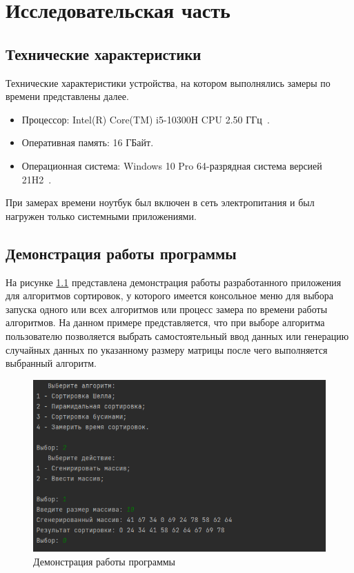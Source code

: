 \chapter{Исследовательская часть}

\section{Технические характеристики}

Технические характеристики устройства, на котором выполнялись замеры по времени представлены далее.

\begin{itemize}[label=---]
	\item Процессор: Intel(R) Core(TM) i5-10300H CPU 2.50 ГГц~\cite{intel}.
	\item Оперативная память: 16 ГБайт.
	\item Операционная система: Windows 10 Pro 64-разрядная система версией 21H2~\cite{windows}.
\end{itemize}

При замерах времени ноутбук был включен в сеть электропитания и был нагружен только системными приложениями.

\clearpage

\section{Демонстрация работы программы}

На рисунке \ref{img:demonstration} представлена демонстрация работы разработанного приложения для алгоритмов сортировок, у которого имеется консольное меню для выбора запуска одного или всех алгоритмов или процесс замера по времени работы алгоритмов. На данном примере представляется, что при выборе алгоритма пользователю позволяется выбрать самостоятельный ввод данных или генерацию случайных данных по указанному размеру матрицы после чего выполняется выбранный алгоритм. 

\begin{figure}[h]
	\centering
	\includegraphics[height=0.35\textheight]{img/example.png}
	\caption{Демонстрация работы программы}
	\label{img:demonstration}
\end{figure}

